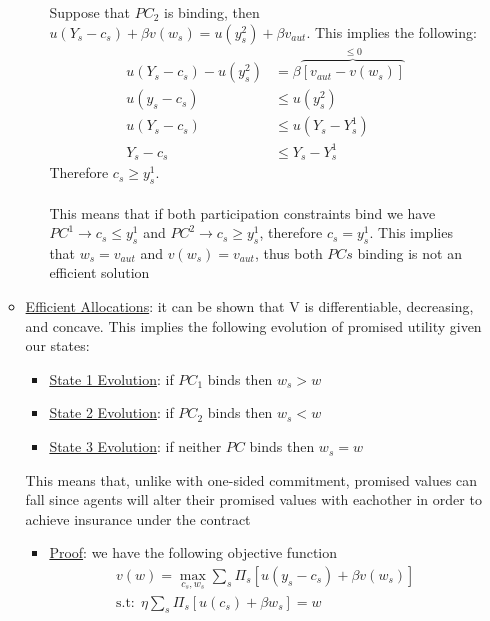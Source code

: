 \documentclass{article}
\begin{document}
\begin{itemize}
\begin{itemize}
\begin{itemize}
            Suppose that $PC_{2}$ is binding, then $u(Y_{s} - c_{s}) + \beta v(w_{s}) = u(y_{s}^{2}) + \beta v_{aut}$. This implies the following:
            \begin{align*}
                u(Y_{s} - c_{s}) - u(y_{s}^{2}) &= \beta \overbrace{[v_{aut} - v(w_{s})]}^{\leq 0} \\
                u(y_{s} - c_{s}) &\leq u(y_{s}^{2}) \\
                u(Y_{s} - c_{s}) &\leq u(Y_{s} - Y_{s}^{1}) \\
                Y_{s} - c_{s} &\leq Y_{s} - Y_{s}^{1}
            \end{align*}
            Therefore $c_{s} \geq y_{s}^{1}$. \\ \\
            This means that if both participation constraints bind we have $PC^{1} \rightarrow c_{s} \leq y_{s}^{1}$ and $PC^{2} \rightarrow c_{s} \geq y_{s}^{1}$, therefore $c_{s} = y_{s}^{1}$. This implies that $w_{s} = v_{aut}$ and $v(w_{s}) = v_{aut}$, thus both $PCs$ binding is not an efficient solution
        \end{itemize}
        \item \underline{Efficient Allocations}: it can be shown that V is differentiable, decreasing, and concave. This implies the following evolution of promised utility given our states:
        \begin{itemize}
            \item  \underline{State 1 Evolution}: if $PC_{1}$ binds then $w_{s} > w$
            \item  \underline{State 2 Evolution}: if $PC_{2}$ binds then $w_{s} < w$
            \item  \underline{State 3 Evolution}: if neither $PC$ binds then $w_{s} = w$
        \end{itemize}
        This means that, unlike with one-sided commitment, promised values can fall since agents will alter their promised values with eachother in order to achieve insurance under the contract
        \begin{itemize}
            \item  \underline{Proof}: we have the following objective function
            \begin{gather*}
                v(w) = \max_{c_{s}, w_{s}} \sum_{s} \Pi_{s} [u(y_{s} - c_{s}) + \beta v(w_{s})] \\
                \text{s.t:} \ \  \eta \sum_{s} \Pi_{s}[u(c_{s}) + \beta w_{s}] = w \\

\end{gather*}
\end{itemize}
\end{itemize}
\end{itemize}
\end{document}
